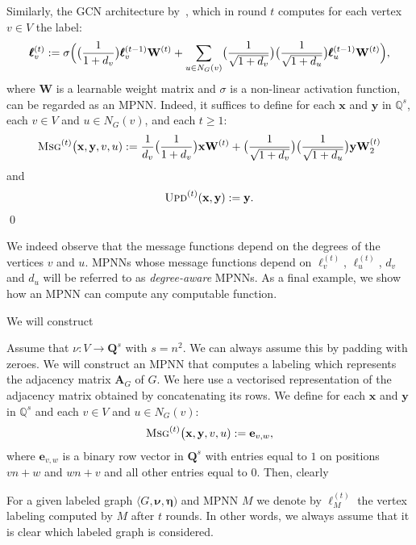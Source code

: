 \begin{example}\normalfont
Similarly, the GCN architecture by~\cite{kipf-loose}, which in round $t$ computes for each vertex $v\in V$ the label:
\begin{equation}
\pmb{\ell}^{(t)}_v:=\sigma\Bigl(\bigl(\frac{1}{1+d_v}\bigr)\pmb{\ell}_v^{(t-1)}\mathbf{W}^{(t)} + \sum_{u\in N_G(v)} \bigl(\frac{1}{\sqrt{1+d_v}}\bigr)\bigl(\frac{1}{\sqrt{1+d_u}}\bigr)\pmb{\ell}^{(t-1)}_u\mathbf{W}^{(t)}\Bigr), \label{GNN:Kipf}
\end{equation}
where $\mathbf{W}$ is a learnable weight matrix and $\sigma$ is a non-linear activation function, can be regarded as an MPNN. Indeed, it suffices to define for each $\mathbf{x}$ and $\mathbf{y}$ in $\mathbb{Q}^s$, each $v\in V$ and $u\in N_G(v)$, and each $t\geq 1$:
$$\textsc{Msg}^{(t)}\bigl(\mathbf{x},\mathbf{y},v,u):=
\frac{1}{d_v}\bigl(\frac{1}{1+d_v}\bigr)\mathbf{x}\mathbf{W}^{(t)}+
\bigl(\frac{1}{\sqrt{1+d_v}}\bigr)\bigl(\frac{1}{\sqrt{1+d_u}}\bigr)\mathbf{y}\mathbf{W}_2^{(t)}
$$
and 
$$\textsc{Upd}^{(t)}(\mathbf{x},\mathbf{y}):=\mathbf{y}.
$$
\qed
\end{example}
We indeed observe that the message functions depend on the degrees of the vertices $v$ and $u$. MPNNs whose message functions depend on 
 $\pmb{\ell}_v^{(t)}$, $\pmb{\ell}_u^{(t)}$, $d_v$ and $d_u$ will be referred to as \textit{degree-aware} MPNNs. As a final example, we show how an MPNN can compute any computable function. 

\begin{example}\normalfont
We will construct	
	
Assume that $\nu:V\to \mathbf{Q}^{s}$ with $s=n^2$. We can always assume this by padding with zeroes.
We  will construct an MPNN that computes a labeling which represents the adjacency matrix $\mathbf{A}_G$ of $G$. We here use a vectorised representation of the adjacency matrix obtained by concatenating its rows.
We define for 
each $\mathbf{x}$ and $\mathbf{y}$ in $\mathbb{Q}^s$ and each $v\in V$ and $u\in N_G(v)$: 
$$
\textsc{Msg}^{(t)}\bigl(\mathbf{x},\mathbf{y},v,u):=\mathbf{e}_{v,w},
$$
where $\mathbf{e}_{v,w}$ is a binary row vector in $\mathbf{Q}^{s}$ with entries equal to $1$ on positions $vn+w$ and $wn+v$ and all other entries equal to $0$. Then,
clearly
\end{example}

For a given labeled graph $\langle G,\pmb{\nu},\pmb{\eta})$ and MPNN $M$ we denote by 
$\pmb{\ell}_M^{(t)}$ the vertex labeling computed by $M$ after $t$ rounds. In other words, we always assume that it is clear which labeled graph is considered.

